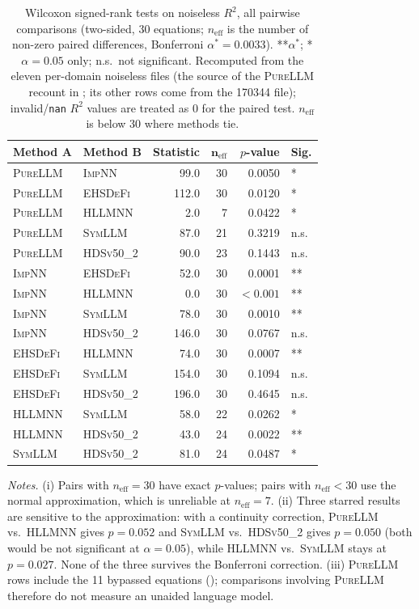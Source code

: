 \documentclass[twoside,11pt]{article}
\newcommand{\PureLLM}{\textsc{PureLLM}}
\newcommand{\INN}{\textsc{ImpNN}}
\newcommand{\EHD}{\textsc{EHSDeFi}}
\newcommand{\HSL}{\textsc{HLLMNN}}
\newcommand{\SEL}{\textsc{SymLLM}}
\newcommand{\HDS}{\textsc{HDSv50\_2}}
\newcommand{\Rsq}{R^{2}}
\begin{document}
\begin{table}[ht]
\centering
\caption{Wilcoxon signed-rank tests on noiseless $\Rsq$, all pairwise comparisons (two-sided,
         30 equations; $n_{\mathrm{eff}}$ is the number of non-zero paired differences,
         Bonferroni $\alpha^*=0.0033$).
         **$\alpha^*$; *$\alpha=0.05$ only; n.s.~not significant.
         Recomputed from the eleven per-domain noiseless files (the source of the \PureLLM{} recount in ; its other rows come from the 170344 file); invalid/\texttt{nan} $\Rsq$ values are treated as 0 for the paired test. $n_{\mathrm{eff}}$ is below 30 where methods tie.}
\label{tab:wilcoxon}
\small
\begin{tabular}{llrrrl}
\toprule
\textbf{Method A} & \textbf{Method B} & \textbf{Statistic} & $\boldsymbol{n_{\mathrm{eff}}}$ &
  \textbf{$p$-value} & \textbf{Sig.} \\
\midrule
\PureLLM & \INN  &  99.0 & 30 &  0.0050  & *  \\
\PureLLM & \EHD  & 112.0 & 30 &  0.0120  & *  \\
\PureLLM & \HSL  &   2.0 &  7 &  0.0422  & *  \\
\PureLLM & \SEL  &  87.0 & 21 &  0.3219  & n.s. \\
\PureLLM & \HDS  &  90.0 & 23 &  0.1443  & n.s. \\
\midrule
\INN     & \EHD  &  52.0 & 30 &  0.0001  & ** \\
\INN     & \HSL  &   0.0 & 30 & $<0.001$ & ** \\
\INN     & \SEL  &  78.0 & 30 &  0.0010  & ** \\
\INN     & \HDS  & 146.0 & 30 &  0.0767  & n.s. \\
\midrule
\EHD     & \HSL  &  74.0 & 30 &  0.0007  & ** \\
\EHD     & \SEL  & 154.0 & 30 &  0.1094  & n.s. \\
\EHD     & \HDS  & 196.0 & 30 &  0.4645  & n.s. \\
\midrule
\HSL     & \SEL  &  58.0 & 22 &  0.0262  & *  \\
\HSL     & \HDS  &  43.0 & 24 &  0.0022  & ** \\
\SEL     & \HDS  &  81.0 & 24 &  0.0487  & *  \\
\bottomrule
\end{tabular}

\smallskip
{\footnotesize \textit{Notes.} (i) Pairs with $n_{\mathrm{eff}}=30$ have exact $p$-values; pairs with
$n_{\mathrm{eff}}<30$ use the normal approximation, which is unreliable at $n_{\mathrm{eff}}=7$.
(ii) Three starred results are sensitive to the approximation: with a continuity correction,
\PureLLM{} vs.\ \HSL{} gives $p=0.052$ and \SEL{} vs.\ \HDS{} gives $p=0.050$ (both would be not significant at
$\alpha=0.05$), while \HSL{} vs.\ \SEL{} stays at $p=0.027$. None of the three survives the Bonferroni correction.
(iii) \PureLLM{} rows include the 11 bypassed equations (); comparisons involving \PureLLM{}
therefore do not measure an unaided language model.}
\end{table}
\end{document}

